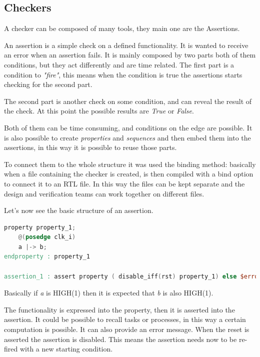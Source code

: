 \subsection{Checkers}
A checker can be composed of many tools, they main one are the Assertions.

An assertion is a simple check on a defined functionality. It is wanted to receive an error when an assertion fails.
It is mainly composed by two parts both of them conditions, but they act differently and are time related. The first part is a condition to \textit{"fire"}, this means when the condition is true the assertions starts checking for the second part.\cite{verification-book-2016}

The second part is another check on some condition, and can reveal the result of the check. At this point the possible results are \textit{True} or \textit{False}.

Both of them can be time consuming, and conditions on the edge are possible.
It is also possible to create \textit{properties} and \textit{sequences} and then embed them into the assertions, in this way it is possible to reuse those parts.

To connect them to the whole structure it was used the binding method: basically when a file containing the checker is created, is then compiled with a bind option to connect it to an RTL file. In this way the files can be kept separate and the design and verification teams can work together on different files. \cite{binding}

Let's now see the basic structure of an assertion.
\bigskip

\linespread{1}
\begin{lstlisting}[language=Verilog,style=verilog-style, backgroundcolor=\color{lyel_palette}, frame=tlb]
property property_1;
    @(posedge clk_i)
	a |-> b;
endproperty : property_1

assertion_1 : assert property ( disable_iff(rst) property_1) else $error("")

\end{lstlisting}
\linespread{1.2}
\bigskip

Basically if \emph{a} is HIGH(1) then it is expected that \emph{b} is also HIGH(1).

The functionality is expressed into the property, then it is asserted into the assertion. It could be possible to recall tasks or processes, in this way a certain computation is possible.
It can also provide an error message.
When the reset is asserted the assertion is disabled. This means the assertion needs now to be re-fired with a new starting condition.

